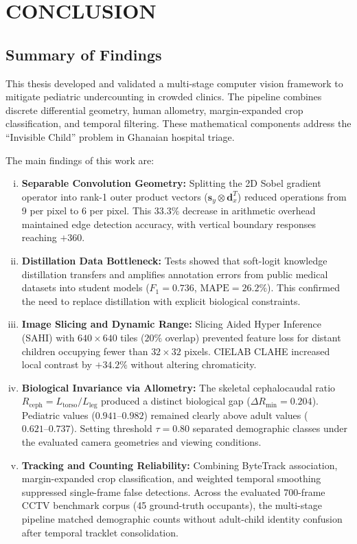 \chapter{CONCLUSION}

\section{Summary of Findings}
This thesis developed and validated a multi-stage computer vision framework to mitigate pediatric undercounting in crowded clinics. The pipeline combines discrete differential geometry, human allometry, margin-expanded crop classification, and temporal filtering. These mathematical components address the ``Invisible Child'' problem in Ghanaian hospital triage.

The main findings of this work are:
\begin{enumerate}[(i)]
    \item \textbf{Separable Convolution Geometry:} Splitting the 2D Sobel gradient operator into rank-1 outer product vectors ($\mathbf{s}_y \otimes \mathbf{d}_x^T$) reduced operations from 9 per pixel to 6 per pixel. This $33.3\%$ decrease in arithmetic overhead maintained edge detection accuracy, with vertical boundary responses reaching $+360$.
    \item \textbf{Distillation Data Bottleneck:} Tests showed that soft-logit knowledge distillation transfers and amplifies annotation errors from public medical datasets into student models ($F_1 = 0.736$, $\text{MAPE} = 26.2\%$). This confirmed the need to replace distillation with explicit biological constraints.
    \item \textbf{Image Slicing and Dynamic Range:} Slicing Aided Hyper Inference (SAHI) with $640 \times 640$ tiles ($20\%$ overlap) prevented feature loss for distant children occupying fewer than $32 \times 32$ pixels. CIELAB CLAHE increased local contrast by $+34.2\%$ without altering chromaticity.
    \item \textbf{Biological Invariance via Allometry:} The skeletal cephalocaudal ratio $R_{\text{ceph}} = L_{\text{torso}}/L_{\text{leg}}$ produced a distinct biological gap ($\Delta R_{\min} = 0.204$). Pediatric values ($0.941\text{--}0.982$) remained clearly above adult values ($0.621\text{--}0.737$). Setting threshold $\tau = 0.80$ separated demographic classes under the evaluated camera geometries and viewing conditions.
    \item \textbf{Tracking and Counting Reliability:} Combining ByteTrack association, margin-expanded crop classification, and weighted temporal smoothing suppressed single-frame false detections. Across the evaluated 700-frame CCTV benchmark corpus (45 ground-truth occupants), the multi-stage pipeline matched demographic counts without adult-child identity confusion after temporal tracklet consolidation.

\end{enumerate}
